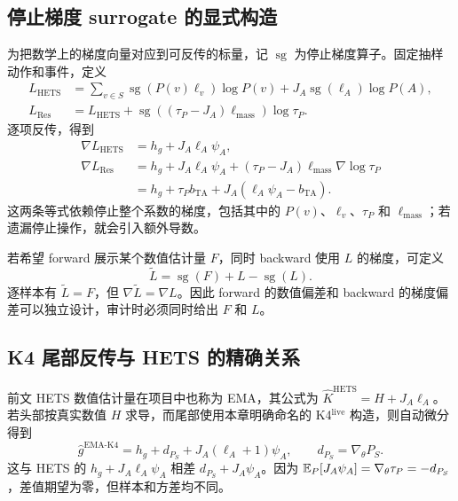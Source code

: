 \subsection{停止梯度 surrogate 的显式构造}

为把数学上的梯度向量对应到可反传的标量，记 $\operatorname{sg}$ 为停止梯度算子。固定抽样动作和事件，定义
\begin{align*}
 L_{\mathrm{HETS}}
 &=\sum_{v\in S}\operatorname{sg}(P(v)\ell_v)\log P(v)
   +J_A\operatorname{sg}(\ell_A)\log P(A),\\
 L_{\mathrm{Res}}
 &=L_{\mathrm{HETS}}
   +\operatorname{sg}((\tau_P-J_A)\ell_{\mathrm{mass}})\log\tau_P.
\end{align*}
逐项反传，得到
\begin{align*}
 \nabla L_{\mathrm{HETS}}&=h_g+J_A\ell_A\psi_A,\\
 \nabla L_{\mathrm{Res}}
 &=h_g+J_A\ell_A\psi_A+(\tau_P-J_A)\ell_{\mathrm{mass}}\nabla\log\tau_P\\
 &=h_g+\tau_Pb_{\mathrm{TA}}+J_A(\ell_A\psi_A-b_{\mathrm{TA}}).
\end{align*}
这两条等式依赖停止整个系数的梯度，包括其中的 $P(v)$、$\ell_v$、$\tau_P$ 和 $\ell_{\mathrm{mass}}$；若遗漏停止操作，就会引入额外导数。

若希望 forward 展示某个数值估计量 $F$，同时 backward 使用 $L$ 的梯度，可定义
\begin{equation*}
 \widetilde L=\operatorname{sg}(F)+L-\operatorname{sg}(L).
\end{equation*}
逐样本有 $\widetilde L=F$，但 $\nabla\widetilde L=\nabla L$。因此 forward 的数值偏差和 backward 的梯度偏差可以独立设计，审计时必须同时给出 $F$ 和 $L$。

\subsection{K4 尾部反传与 HETS 的精确关系}
\label{est:sec:kl-k4-hets}

前文 HETS 数值估计量在项目中也称为 EMA，其公式为 $\widehat K^{\mathrm{HETS}}=H+J_A\ell_A$。若头部按真实数值 $H$ 求导，而尾部使用本章明确命名的 K4$^{\mathrm{live}}$ 构造，则自动微分得到
\begin{equation*}
 \widehat g^{\mathrm{EMA\text{-}K4}}
 =h_g+d_{P_S}+J_A(\ell_A+1)\psi_A,\qquad d_{P_S}=\nabla_\theta P_S.
\end{equation*}
这与 HETS 的 $h_g+J_A\ell_A\psi_A$ 相差 $d_{P_S}+J_A\psi_A$。因为 $\mathbb E_P[J_A\psi_A]=\nabla_\theta\tau_P=-d_{P_S}$，差值期望为零，但样本和方差均不同。


